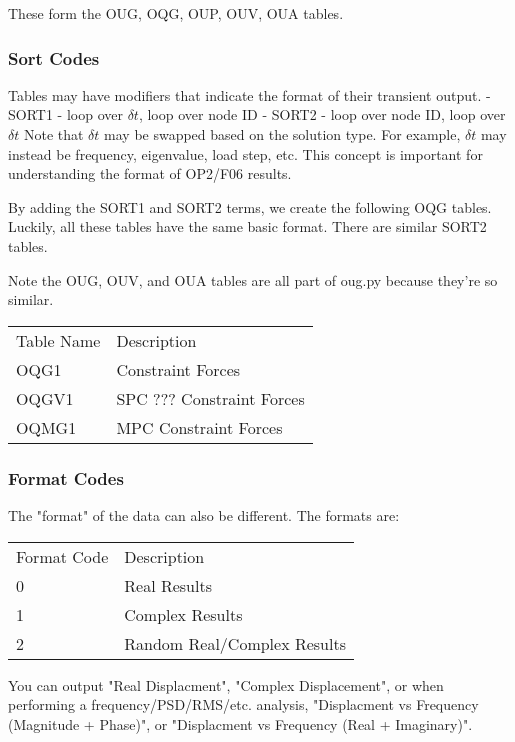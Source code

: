    These form the OUG, OQG, OUP, OUV, OUA tables.  
   
  \subsubsection{Sort Codes}
   Tables may have modifiers that indicate the format of their transient output.
      - SORT1 - loop over $\delta t$, loop over node ID
      - SORT2 - loop over node ID, loop over $\delta t$
   Note that $\delta t$ may be swapped based on the solution type.  For example, 
   $\delta t$ may instead be frequency, eigenvalue, load step, etc.  
   This concept is important for understanding the format of OP2/F06 results.
   
   By adding the SORT1 and SORT2 terms, we create the following OQG tables.
   Luckily, all these tables have the same basic format.
   There are similar SORT2 tables.
   
   Note the OUG, OUV, and OUA tables are all part of oug.py because
   they're so similar.

   \begin{tabular}{ll}
    Table Name & Description             \\
    OQG1   & Constraint Forces           \\
    OQGV1  & SPC ??? Constraint Forces   \\
    OQMG1  & MPC Constraint Forces       \\
   \end {tabular}

   \subsubsection{Format Codes}
    The "format" of the data can also be different.  The formats are:
   \begin{tabular}{ll}
    Format Code & Description                  \\
    0           & Real Results                 \\
    1           & Complex Results              \\
    2           & Random Real/Complex Results  \\
   \end {tabular}
   You can output "Real Displacment", "Complex Displacement", or when performing
   a frequency/PSD/RMS/etc. analysis, "Displacment vs Frequency (Magnitude + Phase)",
   or "Displacment vs Frequency (Real + Imaginary)".
   

